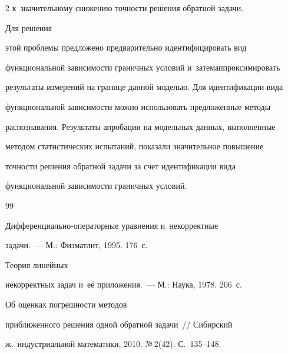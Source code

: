 \begin{multicols}{2}
к~значительному снижению точности решения обратной задачи. 



Для решения 

этой проблемы предложено предварительно идентифицировать вид 

функциональной зависимости граничных условий и~затем\linebreak аппроксимировать 

результаты измерений на границе данной моделью. Для идентификации вида 

функциональной зависимости можно использовать предложенные методы 

распознавания. Результаты апробации на модельных данных, выполненные 

методом статистических испытаний, показали значительное повышение 

точности решения обратной задачи за счет идентификации вида 

функциональной зависимости граничных условий.

  

  

  \vspace*{-6pt}

  

{\small\frenchspacing

 {%


 \begin{thebibliography}{99}



Диф\-фе\-рен\-ци\-аль\-но-опе\-ра\-тор\-ные уравнения и~некорректные 

задачи.~--- М.: Физматлит, 1995. 176~с.


     Теория линейных 

некорректных задач и~её приложения.~--- М.: Наука, 1978. 206~с.


     Об оценках погрешности методов 

приближенного решения одной обратной задачи~// Сибирский 

ж.~индустриальной математики, 2010. №\,2(42). С.~135--148.


\end{thebibliography}}}
\end{multicols}

